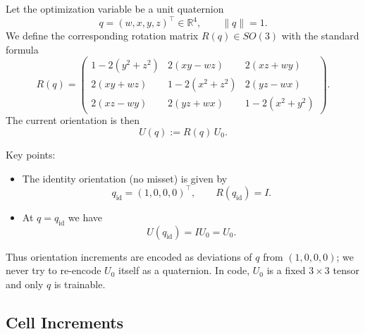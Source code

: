 \documentclass[11pt]{article}
\begin{document}
Let the optimization variable be a unit quaternion
\begin{equation}
  q = (w, x, y, z)^\top \in \mathbb{R}^4, \qquad \|q\| = 1.
\end{equation}
We define the corresponding rotation matrix $R(q) \in SO(3)$ with the standard
formula
\begin{equation}
  R(q) =
  \begin{pmatrix}
    1 - 2(y^2 + z^2) & 2(xy - wz)     & 2(xz + wy) \\
    2(xy + wz)       & 1 - 2(x^2+z^2) & 2(yz - wx) \\
    2(xz - wy)       & 2(yz + wx)     & 1 - 2(x^2+y^2)
  \end{pmatrix}.
\end{equation}
The current orientation is then
\begin{equation}
  U(q) := R(q)\,U_0.
\end{equation}

Key points:
\begin{itemize}
  \item The identity orientation (no misset) is given by
        \begin{equation}
          q_{\text{id}} = (1,0,0,0)^\top,
          \qquad R(q_{\text{id}}) = I.
        \end{equation}
  \item At $q = q_{\text{id}}$ we have
        \begin{equation}
          U(q_{\text{id}}) = I U_0 = U_0.
        \end{equation}
\end{itemize}
Thus orientation increments are encoded as deviations of $q$ from
$(1,0,0,0)$; we never try to re-encode $U_0$ itself as a quaternion.
In code, $U_0$ is a fixed $3\times 3$ tensor and only $q$ is trainable.

\subsection{Cell Increments}
\end{document}
